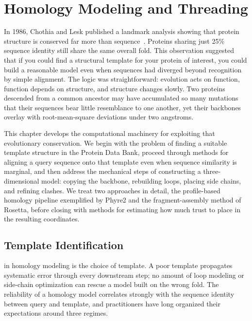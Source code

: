\chapter{Homology Modeling and Threading}
\label{ch:homology-modeling}

In 1986, Chothia and Lesk published a landmark analysis showing that protein structure is conserved far more than sequence~\cite{chothia1986}. Proteins sharing just 25\% sequence identity still share the same overall fold. This observation suggested that if you could find a structural template for your protein of interest, you could build a reasonable model even when sequences had diverged beyond recognition by simple alignment. The logic was straightforward: evolution acts on function, function depends on structure, and structure changes slowly. Two proteins descended from a common ancestor may have accumulated so many mutations that their sequences bear little resemblance to one another, yet their backbones overlay with root-mean-square deviations under two angstroms.

This chapter develops the computational machinery for exploiting that evolutionary conservation. We begin with the problem of finding a suitable template structure in the Protein Data Bank, proceed through methods for aligning a query sequence onto that template even when sequence similarity is marginal, and then address the mechanical steps of constructing a three-dimensional model: copying the backbone, rebuilding loops, placing side chains, and refining clashes. We treat two approaches in detail, the profile-based homology pipeline exemplified by Phyre2 and the fragment-assembly method of Rosetta, before closing with methods for estimating how much trust to place in the resulting coordinates.

\section{Template Identification}
\label{sec:template-identification}

 in homology modeling is the choice of template. A poor template propagates systematic error through every downstream step; no amount of loop modeling or side-chain optimization can rescue a model built on the wrong fold. The reliability of a homology model correlates strongly with the sequence identity between query and template, and practitioners have long organized their expectations around three regimes.

